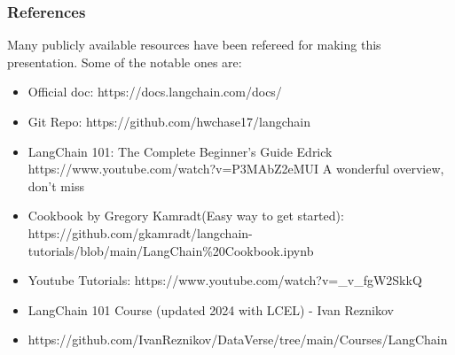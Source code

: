 \begin{frame}\frametitle{References}
Many publicly available resources have been refereed for making this presentation. Some of the notable ones are:
\footnotesize
\begin{itemize}
\item Official doc: https://docs.langchain.com/docs/
\item Git Repo: https://github.com/hwchase17/langchain
\item LangChain 101: The Complete Beginner's Guide Edrick https://www.youtube.com/watch?v=P3MAbZ2eMUI A wonderful overview, don't miss
\item Cookbook by Gregory Kamradt(Easy way to get started): https://github.com/gkamradt/langchain-tutorials/blob/main/LangChain\%20Cookbook.ipynb
\item Youtube Tutorials: https://www.youtube.com/watch?v=\_v\_fgW2SkkQ
\item LangChain 101 Course (updated 2024 with LCEL) - Ivan Reznikov
\item https://github.com/IvanReznikov/DataVerse/tree/main/Courses/LangChain
\end{itemize}

\end{frame}